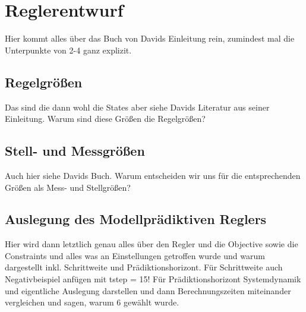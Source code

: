 \chapter{Reglerentwurf} \label{ch_Reglerentwurf}
Hier kommt alles über das Buch von Davids Einleitung rein, zumindest mal die Unterpunkte von 2-4 ganz explizit.

\section{Regelgrößen} \label{sec_Regelgrößen}
Das sind die dann wohl die States aber siehe Davids Literatur aus seiner Einleitung.
Warum sind diese Größen die Regelgrößen?

\section{Stell- und Messgrößen} \label{sec_StellMessgrößen}
Auch hier siehe Davids Buch.
Warum entscheiden wir uns für die entsprechenden Größen als Mess- und Stellgrößen?

\section{Auslegung des Modellprädiktiven Reglers} \label{sec_AuslegungMPC}
Hier wird dann letztlich genau alles über den Regler und die Objective sowie die Constraints und alles was an Einstellungen getroffen wurde und warum dargestellt inkl. Schrittweite und Prädiktionshorizont. Für Schrittweite auch Negativbeispiel anfügen mit tstep = 15! Für Prädiktionshorizont Systemdynamik und eigentliche Auslegung darstellen und dann Berechnungszeiten miteinander vergleichen und sagen, warum 6 gewählt wurde.

